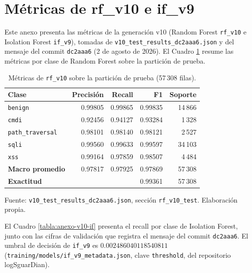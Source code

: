 \section{Métricas de rf\_v10 e if\_v9}\label{anexo:v10}

Este anexo presenta las métricas de la generación v10 (Random Forest \texttt{rf\_v10} e Isolation Forest \texttt{if\_v9}), tomadas de \texttt{v10\_test\_results\_dc2aaa6.json} y del mensaje del commit \texttt{dc2aaa6} (2 de agosto de 2026). El Cuadro \ref{tabla:anexo-v10-rf} resume las métricas por clase de Random Forest sobre la partición de prueba.

\begin{table}[htbp]
\centering
\footnotesize
\begin{tabular}{|l|r|r|r|r|}
\hline
\textbf{Clase} & \textbf{Precisión} & \textbf{Recall} & \textbf{F1} & \textbf{Soporte} \\ \hline
\texttt{benign} & 0.99805 & 0.99865 & 0.99835 & 14\,866 \\ \hline
\texttt{cmdi} & 0.92456 & 0.94127 & 0.93284 & 1\,328 \\ \hline
\texttt{path\_traversal} & 0.98101 & 0.98140 & 0.98121 & 2\,527 \\ \hline
\texttt{sqli} & 0.99560 & 0.99633 & 0.99597 & 34\,103 \\ \hline
\texttt{xss} & 0.99164 & 0.97859 & 0.98507 & 4\,484 \\ \hline
\textbf{Macro promedio} & 0.97817 & 0.97925 & 0.97869 & 57\,308 \\ \hline
\textbf{Exactitud} & & & 0.99361 & 57\,308 \\ \hline
\end{tabular}
\caption{Métricas de \texttt{rf\_v10} sobre la partición de prueba (57\,308 filas).}
\label{tabla:anexo-v10-rf}
\par\smallskip\footnotesize Fuente: \texttt{v10\_test\_results\_dc2aaa6.json}, sección \texttt{rf\_v10\_test}. Elaboración propia.
\end{table}

El Cuadro \ref{tabla:anexo-v10-if} presenta el recall por clase de Isolation Forest, junto con las cifras de validación que registra el mensaje del commit \texttt{dc2aaa6}. El umbral de decisión de \texttt{if\_v9} es $0.002486040\allowbreak 118540811$ (\texttt{training/models/if\_v9\_metadata.json}, clave \texttt{threshold}, del repositorio logSguarDian).

